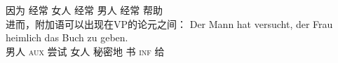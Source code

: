	因为 \spacebr{}经常  女人 \spacebr{}经常  男人 \spacebr{}经常 帮助\\
\z
进而，附加语可以出现在VP的论元之间：
\ea
\gll Der Mann hat versucht, der Frau heimlich das Buch zu geben.\\
	 男人 \textsc{aux} 尝试  女人 秘密地  书 \textsc{inf} 给\\
\z 

